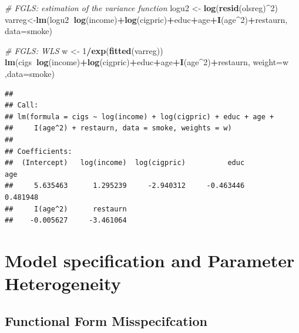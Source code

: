 \documentclass[]{book}
\newenvironment{Shaded}{\begin{snugshade}}{\end{snugshade}}
\newcommand{\CommentTok}[1]{\textcolor[rgb]{0.56,0.35,0.01}{\textit{#1}}}
\newcommand{\DataTypeTok}[1]{\textcolor[rgb]{0.13,0.29,0.53}{#1}}
\newcommand{\DecValTok}[1]{\textcolor[rgb]{0.00,0.00,0.81}{#1}}
\newcommand{\KeywordTok}[1]{\textcolor[rgb]{0.13,0.29,0.53}{\textbf{#1}}}
\newcommand{\NormalTok}[1]{#1}
\newcommand{\OperatorTok}[1]{\textcolor[rgb]{0.81,0.36,0.00}{\textbf{#1}}}
\newcommand{\StringTok}[1]{\textcolor[rgb]{0.31,0.60,0.02}{#1}}
\begin{document}
\begin{Shaded}
\begin{Highlighting}[]
\CommentTok{# FGLS: estimation of the variance function}
\NormalTok{logu2 <-}\StringTok{ }\KeywordTok{log}\NormalTok{(}\KeywordTok{resid}\NormalTok{(olsreg)}\OperatorTok{^}\DecValTok{2}\NormalTok{)}
\NormalTok{varreg<-}\KeywordTok{lm}\NormalTok{(logu2}\OperatorTok{~}\KeywordTok{log}\NormalTok{(income)}\OperatorTok{+}\KeywordTok{log}\NormalTok{(cigpric)}\OperatorTok{+}\NormalTok{educ}\OperatorTok{+}\NormalTok{age}\OperatorTok{+}\KeywordTok{I}\NormalTok{(age}\OperatorTok{^}\DecValTok{2}\NormalTok{)}\OperatorTok{+}\NormalTok{restaurn, }
           \DataTypeTok{data=}\NormalTok{smoke)}

\CommentTok{# FGLS: WLS}
\NormalTok{w <-}\StringTok{ }\DecValTok{1}\OperatorTok{/}\KeywordTok{exp}\NormalTok{(}\KeywordTok{fitted}\NormalTok{(varreg))}
\KeywordTok{lm}\NormalTok{(cigs}\OperatorTok{~}\KeywordTok{log}\NormalTok{(income)}\OperatorTok{+}\KeywordTok{log}\NormalTok{(cigpric)}\OperatorTok{+}\NormalTok{educ}\OperatorTok{+}\NormalTok{age}\OperatorTok{+}\KeywordTok{I}\NormalTok{(age}\OperatorTok{^}\DecValTok{2}\NormalTok{)}\OperatorTok{+}\NormalTok{restaurn, }
   \DataTypeTok{weight=}\NormalTok{w ,}\DataTypeTok{data=}\NormalTok{smoke)}
\end{Highlighting}
\end{Shaded}

\begin{verbatim}
## 
## Call:
## lm(formula = cigs ~ log(income) + log(cigpric) + educ + age + 
##     I(age^2) + restaurn, data = smoke, weights = w)
## 
## Coefficients:
##  (Intercept)   log(income)  log(cigpric)          educ           age  
##     5.635463      1.295239     -2.940312     -0.463446      0.481948  
##     I(age^2)      restaurn  
##    -0.005627     -3.461064
\end{verbatim}

\hypertarget{model-specification-and-parameter-heterogeneity}{%
\section{Model specification and Parameter Heterogeneity}\label{model-specification-and-parameter-heterogeneity}}

\hypertarget{functional-form-misspecifcation}{%
\subsection{Functional Form Misspecifcation}\label{functional-form-misspecifcation}}
\end{document}
